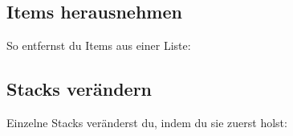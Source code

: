 \begin{Shaded}
\begin{Highlighting}[]
  \OperatorTok{=}\OperatorTok{(}\OperatorTok{)}
  \OperatorTok{=} \OperatorTok{:}\OperatorTok{(}\OperatorTok{,} \OperatorTok{)}
 \OperatorTok{:}\OperatorTok{()} \OperatorTok{\textgreater{}}  
    \OperatorTok{(}
             \OperatorTok{:}\OperatorTok{()}
             
    \OperatorTok{)}
\end{Highlighting}
\end{Shaded}

\subsection{Items herausnehmen}\label{items-herausnehmen}

So entfernst du Items aus einer Liste:

\begin{Shaded}
\begin{Highlighting}[]
  \OperatorTok{=} \OperatorTok{:}\OperatorTok{(}\OperatorTok{,} \OperatorTok{)}
\OperatorTok{(}  \OperatorTok{:}\OperatorTok{())}
\end{Highlighting}
\end{Shaded}

\subsection{Stacks verändern}\label{stacks-veruxe4ndern}

Einzelne Stacks veränderst du, indem du sie zuerst holst:

\begin{Shaded}
\begin{Highlighting}[]
  \OperatorTok{=} \OperatorTok{:}\OperatorTok{(}\OperatorTok{,} \OperatorTok{)}
\end{Highlighting}
\end{Shaded}

